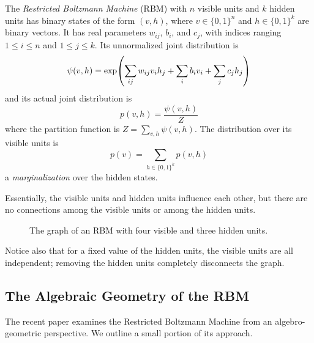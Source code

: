 \documentclass[11pt,titlepage]{article}
\numberwithin{equation}{section}
\begin{document}
    \begin{definition}
    The \emph{Restricted Boltzmann Machine} (RBM) with $n$ visible units and $k$
    hidden units has binary states of the form $(v, h)$, where $v \in \{0,1\}^n$
    and $h \in \{0,1\}^k$ are binary vectors.  It has real parameters $w_{ij}$,
    $b_i$, and $c_j$, with indices ranging $1 \le i \le n$ and $1 \le j \le k$.
    Its unnormalized joint distribution is
    \begin{equation}\label{eq:rbm-unnorm}
        \psi(v, h) = \exp\pdil*{
            \sum_{ij} w_{ij} v_i h_j + \sum_i b_i v_i + \sum_j c_j h_j
        }
    \end{equation}
    and its actual joint distribution is 
    \[
        p(v, h) = \frac{\psi(v,h)}{Z}
    \] 
    where the partition function is $Z = \sum_{v,h} \psi(v, h)$.  The
    distribution over its visible units is
    \[
        p(v) = \sum_{h \in \{0,1\}^k} p(v,h)
    \]
    a \emph{marginalization} over the hidden states.
    \end{definition}
    Essentially, the visible units and hidden units influence each other, but
    there are no connections among the visible units or among the hidden units.
    \begin{figure}[H]
        \centering
        \caption{The graph of an RBM with four visible and three hidden units.}
    \end{figure}
    \noindent Notice also that for a fixed value of the hidden units, the
    visible units are all independent; removing the hidden units completely
    disconnects the graph.
    
\subsection{The Algebraic Geometry of the RBM}
    The recent paper \cite{CMS09} examines the Restricted Boltzmann Machine from
    an algebro-geometric perspective.  We outline a small portion of its
    approach.
    
\end{document}
